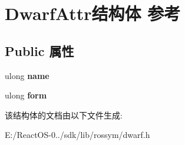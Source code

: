 \hypertarget{struct_dwarf_attr}{}\section{Dwarf\+Attr结构体 参考}
\label{struct_dwarf_attr}
\subsection*{Public 属性}
\begin{DoxyCompactItemize}
\item 
\mbox{\label{struct_dwarf_attr_ae928008029485d987f6f6f35676075cc}} 
ulong {\bfseries name}
\item 
\mbox{\label{struct_dwarf_attr_ab793f553276afedd895e971230eb9161}} 
ulong {\bfseries form}
\end{DoxyCompactItemize}


该结构体的文档由以下文件生成\+:\begin{DoxyCompactItemize}
\item 
E\+:/\+React\+O\+S-\/0../sdk/lib/rossym/dwarf.\+h\end{DoxyCompactItemize}
